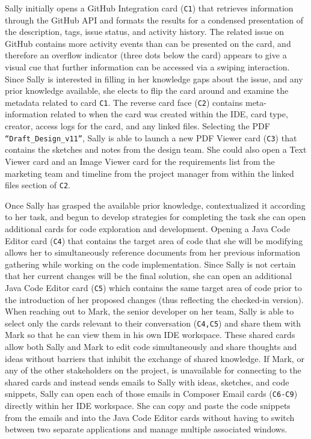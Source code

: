 \documentclass{ppig}
\begin{document}
Sally initially opens a GitHub Integration card (\texttt{C1}) that retrieves information through the GitHub API and formats the results for a condensed presentation of the description, tags, issue status, and activity history.
The related issue on GitHub contains more activity events than can be presented on the card, and therefore an overflow indicator (three dots below the card) appears to give a visual cue that further information can be accessed via a swiping interaction.
Since Sally is interested in filling in her knowledge gaps about the issue, and any prior knowledge available, she elects to flip the card around and examine the metadata related to card \texttt{C1}.
The reverse card face (\texttt{C2}) contains meta-information related to when the card was created within the IDE, card type, creator, access logs for the card, and any linked files.
Selecting the PDF \texttt{``Draft\_Design\_v11''}, Sally is able to launch a new PDF Viewer card (\texttt{C3}) that contains the sketches and notes from the design team.
She could also open a Text Viewer card and an Image Viewer card for the requirements list from the marketing team and timeline from the project manager from within the linked files section of \texttt{C2}.

Once Sally has grasped the available prior knowledge, contextualized it according to her task, and begun to develop strategies for completing the task she can open additional cards for code exploration and development.
Opening a Java Code Editor card (\texttt{C4}) that contains the target area of code that she will be modifying allows her to simultaneously reference documents from her previous information gathering while working on the code implementation.
Since Sally is not certain that her current changes will be the final solution, she can open an additional Java Code Editor card (\texttt{C5}) which contains the same target area of code prior to the introduction of her proposed changes (thus reflecting the checked-in version).
When reaching out to Mark, the senior developer on her team, Sally is able to select only the cards relevant to their conversation (\texttt{C4,C5}) and share them with Mark so that he can view them in his own IDE workspace.
These shared cards allow both Sally and Mark to edit code simultaneously and share thoughts and ideas without barriers that inhibit the exchange of shared knowledge.
If Mark, or any of the other stakeholders on the project, is unavailable for connecting to the shared cards and instead sends emails to Sally with ideas, sketches, and code snippets, Sally can open each of those emails in Composer Email cards (\texttt{C6-C9}) directly within her IDE workspace.
She can copy and paste the code snippets from the emails and into the Java Code Editor cards without having to switch between two separate applications and manage multiple associated windows.
\end{document}
